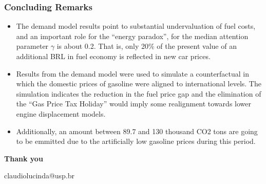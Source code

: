 \documentclass{beamer}
\begin{document}
\begin{frame}[fragile]\frametitle{Concluding Remarks}
\begin{itemize}
    \item The demand model results point to substantial undervaluation of fuel costs, and an important role for the ``energy paradox'', for the median attention parameter $\gamma$ is about 0.2. That is, only 20\% of the present value of an additional BRL in fuel economy is reflected in new car prices.

    \item Results from the demand model were used to simulate a counterfactual in which the domestic prices of gasoline were aligned to international levels. The simulation indicates the reduction in the fuel price gap and the elimination of the ``Gas Price Tax Holiday'' would imply some realignment towards lower engine displacement models. 
    \item Additionally, an amount between 89.7 and 130 thousand CO2 tons are going to be emmitted due to the artificially low gasoline prices during this period.
\end{itemize}
    


\end{frame}

\begin{frame}[plain,c]

\begin{center}
\Huge \textbf{Thank you}

claudiolucinda@usp.br
\end{center}

\end{frame}

\begin{frame}[allowframebreaks]





\end{frame}
\end{document}
